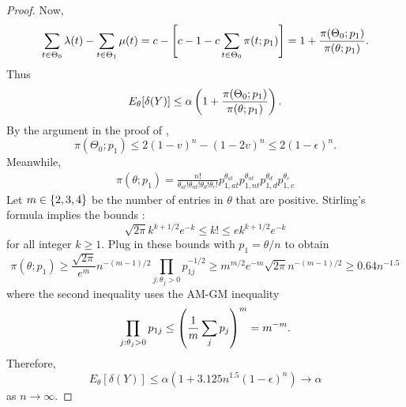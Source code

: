 \documentclass[12pt,reqno]{amsart}
\begin{document}
\begin{proof}
    Now, \[
        \sum_{t \in \Theta_0} \lambda(t) - \sum_{t\in \Theta_1} \mu(t) = c - \left[{c - 1 - c
        \sum_{t\in \Theta_0} \pi(t; p_1) }\right] = 1 + \frac{\pi(\Theta_0; p_1)}{\pi(\theta; p_1)}.
    \]
    Thus \[
        E_\theta[\delta(Y)]  \le \alpha \left(1 + \frac{\pi(\Theta_0; p_1)}{\pi(\theta; p_1)}\right).
    \]
    By the argument in the proof of , \[
        \pi(\Theta_0; p_1) \le 2(1-v)^n - (1-2v)^n \le 2(1-\epsilon)^n.
    \]
    Meanwhile, \begin{align*}
    \pi(\theta; p_1) = \frac{n!}{\theta_{at}!\theta_{nt}!\theta_d!\theta_{c}!} p_{1,at}^
    {\theta_{at}} p_{1,nt}^{\theta_{nt}} p_{1,d}^{\theta_{d}} p_{1,c}^{\theta_{c}}
    \end{align*}
    Let $ m \in \left\{{2,3,4}\right\}$ be the number of entries in $\theta$ that are positive.
    Stirling's formula implies the bounds \citep{robbins1955remark}: \[
      \sqrt{2\pi} k^{k+1/2} e^{-k} \le k! \le e k^{k+1/2} e^{-k}
    \]
    for all integer $k \ge 1$. Plug in these bounds with $p_1 = \theta/n$ to obtain \[
          \pi(\theta; p_1) \ge \frac{\sqrt{2\pi}}{e^m} n^{-(m-1)/2} \prod_{j: \theta_j >
          0} p_{1j}^{-1/2} \ge m^{m/2} e^{-m} \sqrt{2\pi} n^{-(m-1)/2} \ge 0.64 n^{-1.5}
    \]
where the second inequality uses the AM-GM inequality\[
    \prod_{j: \theta_j >
          0} p_{1j} \le \left(\frac{1}{m} \sum_j p_j\right)^m = m^{-m}.
\]
Therefore, \[
    E_\theta [\delta(Y)] \le \alpha(1+3.125 n^{1.5}(1-\epsilon)^n) \to \alpha
\]
as $n \to \infty$.
\end{proof}


\bayescombined*
\end{document}
